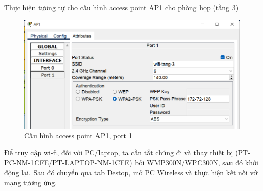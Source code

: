 \begin{enumerate}
\begin{enumerate}
Thực hiện tương tự cho cấu hình access point AP1 cho phòng họp (tầng 3)
\begin{figure}[H]
\begin{center}
\includegraphics[scale=.6]{../figures/p2/ap3}
\end{center}
\caption{Cấu hình access point AP1, port 1}
\end{figure}

Để truy cập wi-fi, đối với PC/laptop, ta cần tắt chúng đi và thay thiết bị (PT-PC-NM-1CFE/PT-LAPTOP-NM-1CFE) bởi WMP300N/WPC300N, sau đó khởi động lại. Sau đó chuyển qua tab Destop, mở PC Wireless và thực hiện kết nối với mạng tương ứng.


\end{enumerate}
\end{enumerate}
